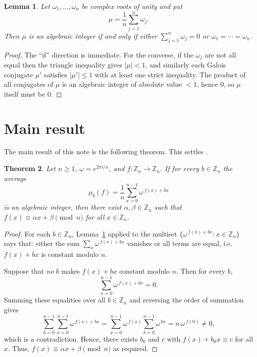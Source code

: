 \documentclass[11pt]{amsart}
\newtheorem{thm}{Theorem}[section]
\newtheorem{lemma}[thm]{Lemma}
\theoremstyle{definition}
\theoremstyle{remark}
\numberwithin{equation}{section}
\begin{document}
\begin{lemma}\label{lem:criterion}%
	Let $\omega_1,\ldots,\omega_n$ be complex roots of unity and put
	\[
		\mu=\frac1n\sum_{j=1}^n\omega_j.
	\]
	Then $\mu$ is an algebraic integer if and only if either $\sum_{j=1}^n\omega_j=0$ or $\omega_1=\cdots=\omega_n$.
\end{lemma}

\begin{proof}
	The ``if'' direction is immediate. For the converse, if the $\omega_j$ are not all equal then the triangle inequality gives $|\mu|<1$, and similarly each Galois conjugate $\mu'$ satisfies $|\mu'|\le1$ with at least one strict inequality. The product of all conjugates of $\mu$ is an algebraic integer of absolute value $<1$, hence $0$, so $\mu$ itself must be $0$.
\end{proof}

\section{Main result}\label{sec:main}
The main result of this note is the following theorem. This settles \cite[Conjecture 9]{panraksa2017note}.
\begin{thm}\label{thm:alln}
	Let $n\ge 1$, $\omega=e^{2\pi i/n}$, and $f:\mathbb Z_n\to\mathbb Z_n$.
	If for every $b\in\mathbb Z_n$ the average
	\[
		\mu_{b}(f)=\frac1n\sum_{x=0}^{n-1}\omega^{\,f(x)+bx}
	\]
	is an algebraic integer, then there exist $\alpha, \beta \in \mathbb{Z}_n$ such that
	$f(x)\equiv \alpha x+\beta \pmod n$ for all $x\in\mathbb Z_n$.
\end{thm}

\begin{proof}
	For each $b\in\mathbb{Z}_n$, Lemma~\ref{lem:criterion} applied to the multiset $\{\omega^{\,f(x)+bx}:x\in\mathbb{Z}_n\}$ says that: either the sum $\sum_x\omega^{\,f(x)+bx}$ vanishes or all terms are equal, i.e.\ $f(x)+bx$ is constant modulo $n$.

	Suppose that \emph{no} $b$ makes $f(x)+bx$ constant modulo $n$. Then for every $b$,
	\[
		\sum_{x=0}^{n-1}\omega^{\,f(x)+bx}=0.
	\]
	Summing these equalities over all $b\in\mathbb{Z}_n$ and reversing the order of summation gives
	\[
		\sum_{b=0}^{n-1}\sum_{x=0}^{n-1}\omega^{\,f(x)+bx}
		=\sum_{x=0}^{n-1}\omega^{\,f(x)}\!\sum_{b=0}^{n-1}\omega^{\,bx}
		= n\,\omega^{\,f(0)}\neq 0,
	\]
	which is a contradiction. Hence, there exists $b_0$ and $c$ with $f(x)+b_0x\equiv c$ for all $x$. Thus, $f(x)\equiv \alpha x+\beta \pmod n$ as required.
\end{proof}
\end{document}
